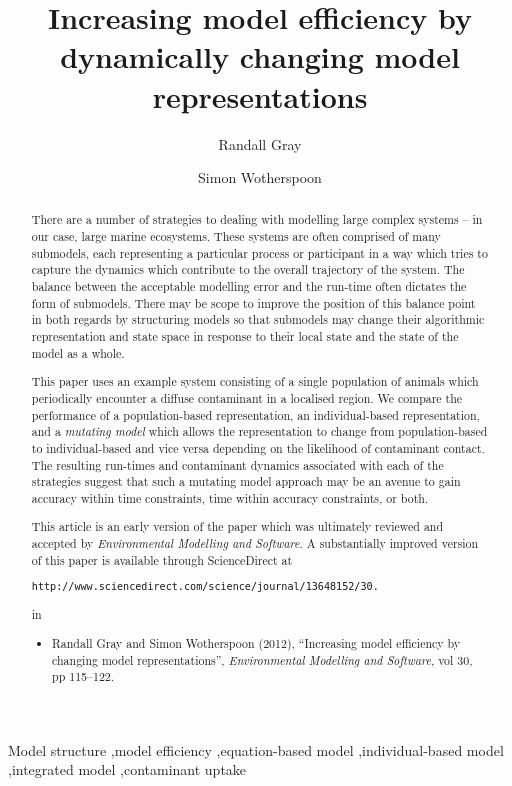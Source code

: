 \documentclass[review,authoryear,5p,twocolumn]{article}
\begin{document}
\begin{frontmatter}
\title{Increasing model efficiency by dynamically changing model representations}
\author{Randall Gray}
\address{CSIRO Division of Marine and Atmospheric Research}
\author{Simon Wotherspoon}
\address{University of Tasmania}
\begin{abstract}
  There are a number of strategies to dealing with modelling large complex systems -- in our case, large marine
  ecosystems. These systems are often comprised of many submodels, each representing a particular process or
  participant in a way which tries to capture the dynamics which contribute to the overall trajectory of the system.
  The balance between the acceptable modelling error and the run-time often dictates the form of submodels. There may
  be scope to improve the position of this balance point in both regards by structuring models so that submodels may
  change their algorithmic representation and state space in response to their local state and the state of the model
  as a whole.
  
  This paper uses an example system consisting of a single population of animals which periodically encounter a diffuse
  contaminant in a localised region. We compare the performance of a population-based representation, an
  individual-based representation, and a {\em{mutating model}} which allows the representation to change from
  population-based to individual-based and vice versa depending on the likelihood of contaminant contact. The resulting
  run-times and contaminant dynamics associated with each of the strategies suggest that such a mutating model approach
  may be an avenue to gain accuracy within time constraints, time within accuracy constraints, or both.

  This article is an early version of the paper which was ultimately 
  reviewed and accepted by \emph{Environmental Modelling and
    Software}.  A substantially improved version of this paper    
  is available through ScienceDirect at 
  \begin{verbatim}http://www.sciencedirect.com/science/journal/13648152/30.\end{verbatim}
  in 
  
  \begin{itemize}
  \item[ ]  Randall Gray and Simon Wotherspoon (2012), ``Increasing model
    efficiency by changing model representations'',
    \emph{Environmental Modelling and Software}, vol 30, pp 115--122.
  \end{itemize}
    
\end{abstract}
\begin{keyword}
Model structure \sep model efficiency \sep equation-based model \sep individual-based model \sep integrated model \sep contaminant uptake
\end{keyword}
\end{frontmatter}
\end{document}

